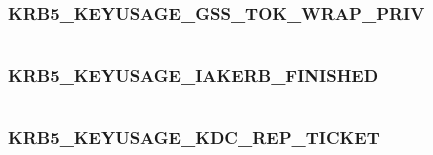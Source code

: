 \documentclass[letterpaper,10pt,english]{sphinxmanual}
\begin{document}
\subsubsection{KRB5\_KEYUSAGE\_GSS\_TOK\_WRAP\_PRIV}
\label{appdev/refs/macros/KRB5_KEYUSAGE_GSS_TOK_WRAP_PRIV:krb5-keyusage-gss-tok-wrap-priv-data}\label{appdev/refs/macros/KRB5_KEYUSAGE_GSS_TOK_WRAP_PRIV::doc}\label{appdev/refs/macros/KRB5_KEYUSAGE_GSS_TOK_WRAP_PRIV:krb5-keyusage-gss-tok-wrap-priv}

\begin{fulllineitems}
\label{appdev/refs/macros/KRB5_KEYUSAGE_GSS_TOK_WRAP_PRIV:KRB5_KEYUSAGE_GSS_TOK_WRAP_PRIV}
\end{fulllineitems}


\begin{tabulary}{\linewidth}{|L|L|}
\hline

 & 
\\
\hline\end{tabulary}



\subsubsection{KRB5\_KEYUSAGE\_IAKERB\_FINISHED}
\label{appdev/refs/macros/KRB5_KEYUSAGE_IAKERB_FINISHED:krb5-keyusage-iakerb-finished-data}\label{appdev/refs/macros/KRB5_KEYUSAGE_IAKERB_FINISHED::doc}\label{appdev/refs/macros/KRB5_KEYUSAGE_IAKERB_FINISHED:krb5-keyusage-iakerb-finished}

\begin{fulllineitems}
\label{appdev/refs/macros/KRB5_KEYUSAGE_IAKERB_FINISHED:KRB5_KEYUSAGE_IAKERB_FINISHED}
\end{fulllineitems}


\begin{tabulary}{\linewidth}{|L|L|}
\hline

 & 
\\
\hline\end{tabulary}



\subsubsection{KRB5\_KEYUSAGE\_KDC\_REP\_TICKET}
\label{appdev/refs/macros/KRB5_KEYUSAGE_KDC_REP_TICKET::doc}\label{appdev/refs/macros/KRB5_KEYUSAGE_KDC_REP_TICKET:krb5-keyusage-kdc-rep-ticket-data}\label{appdev/refs/macros/KRB5_KEYUSAGE_KDC_REP_TICKET:krb5-keyusage-kdc-rep-ticket}
\end{document}
